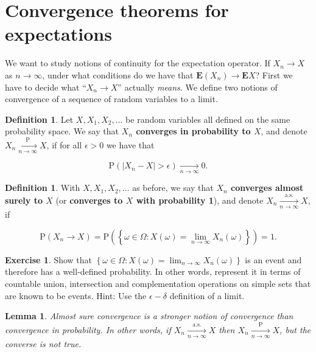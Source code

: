 \documentclass[11pt]{report}
\theoremstyle{plain}
\newtheorem{lem}[thm]{Lemma}
\theoremstyle{definition}
\newtheorem{defn}[thm]{Definition}
\newtheorem{xexercise}[thm]{Exercise}
\begin{document}
\section{Convergence theorems for expectations}
We want to study notions of continuity for the
expectation operator. If $X_n\to X$ as $n\to\infty$,
under what conditions do we have that
$\mathbf{E}(X_n)\to \mathbf{E} X$? First we have to
decide what ``$X_n\to X$'' actually \emph{means}. We
define two notions of convergence of a sequence of
random variables to a limit.

\begin{defn}
Let $X, X_1, X_2, \ldots$ be random variables all
defined on the same probability space. We say that
\textbf{$X_n$ converges in probability to $X$}, and denote
$X_n \xrightarrow[n\to\infty]{\mathrm{P}} X$, if for
all $\epsilon>0$ we have that

\[
\mathrm{P}(|X_n-X|>\epsilon) \xrightarrow[n\to\infty]{} 0.
\]

\end{defn}

\begin{defn}
With $X,X_1,X_2,\ldots$ as before, we say that \textbf{$X_n$
converges almost surely to $X$} (or \textbf{converges to $X$
with probability 1}), and denote
$X_n \xrightarrow[n\to\infty]{\textrm{a.s.}} X$, if

\[
\mathrm{P}( X_n \to X ) = \mathrm{P}\left(\left\{ \omega \in \Omega : X(\omega)=\lim_{n\to\infty} X_n(\omega) \right\} \right) = 1.
\]

\end{defn}

\begin{xexercise}
Show that
$\left\{ \omega \in \Omega :
X(\omega)=\lim_{n\to\infty} X_n(\omega) \right\}$
is an event and therefore has a well-defined
probability. In other words, represent it in terms of
countable union, intersection and complementation
operations on simple sets that are known to be events.
Hint: Use the $\epsilon-\delta$ definition of a
limit.
\end{xexercise}

\begin{lem}
\label{lem-convergence-types}
Almost sure convergence is a stronger notion of
convergence than convergence in probability. In other
words, if
$X_n\xrightarrow[n\to\infty]{\textrm{a.s.}} X$ then
$X_n\xrightarrow[n\to\infty]{\mathrm{P}} X$, but the
converse is not true.
\end{lem}
\end{document}
